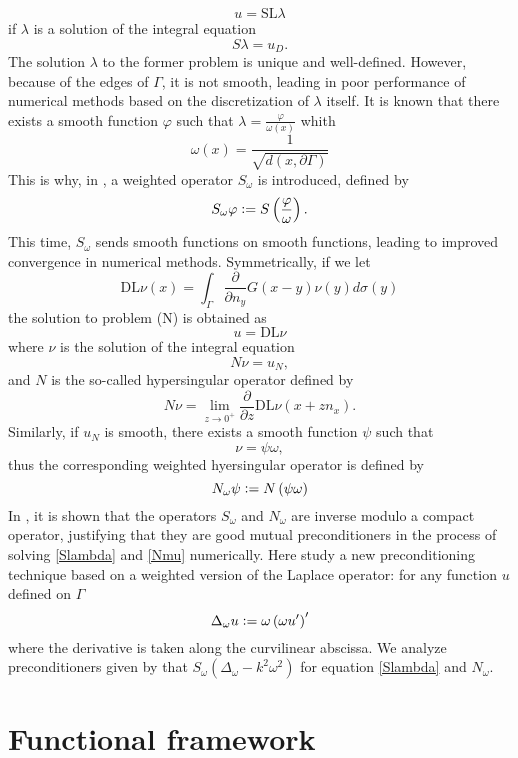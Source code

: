 \documentclass[]{article}
\begin{document}
\[ u = \text{SL} \lambda \]
if $\lambda$ is a solution of the integral equation 
\begin{equation}
	S \lambda = u_D.
	\label{Slambda}
\end{equation} 
The solution $\lambda$ to the former problem is unique and well-defined. However, because of the edges of $\Gamma$, it is not smooth, leading in poor performance of numerical methods based on the discretization of $\lambda$ itself. It is known that there exists a smooth function $\varphi$ such that $ \lambda = \frac{\varphi}{\omega(x)}$ whith 
\[\omega(x) = \dfrac{1}{\sqrt{d(x,\partial \Gamma)}}\]
This is why, in \cite{bruno2012second}, a weighted operator $S_{\omega}$ is introduced, defined by 
\[S_{\omega} \varphi \mathrel{\mathop:}= S \left(\dfrac{\varphi}{\omega}\right).\]
This time, $S_\omega$ sends smooth functions on smooth functions, leading to improved convergence in numerical methods. 
Symmetrically, if we let 
\begin{equation}
\text{DL}\nu(x) = \int_{\Gamma}\dfrac{\partial}{\partial n_y} G(x-y)\nu(y)d\sigma(y)
\end{equation}
the solution to problem (N) is obtained as 
\[u = \text{DL}\nu\] where $\nu$ is the solution of the integral equation
\begin{equation}
N \nu = u_N,
	\label{Nmu}
\end{equation}
and $N$ is the so-called hypersingular operator defined by 
\[N\nu = \lim_{z \to 0^+}\dfrac{\partial}{\partial z}\text{DL}\nu(x + z n_x).\]
Similarly, if $u_N$ is smooth, there exists a smooth function $\psi$ such that 
\[\nu = \psi\omega,\]
thus the corresponding weighted hyersingular operator is defined by 
\[N_{\omega}\psi \mathrel{\mathop:}= N\left(\psi \omega\right)\]
In \cite{bruno2012second}, it is shown that the operators $S_{\omega}$ and $N_{\omega}$ are inverse modulo a compact operator, justifying that they are good mutual preconditioners in the process of solving \eqref{Slambda} and \eqref{Nmu} numerically. 
Here study a new preconditioning technique based on a weighted version of the Laplace operator: for any function $u$ defined on $\Gamma$
\[\Delta_{\omega}u \mathrel{\mathop:}= \omega\left(\omega u'\right)'\]
where the derivative is taken along the curvilinear abscissa. We analyze preconditioners given by that $S_\omega (\Delta_\omega - k^2 \omega^2)$ for equation \eqref{Slambda} and $N_{\omega}$.
\section{Functional framework}
\end{document}
